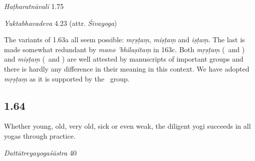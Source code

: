 \begin{ekdosis}
\begin{testimonia}[hp01_063]
\emph{Haṭharatnāvalī} 1.75

\begin{versinnote}
\end{versinnote}

\emph{Yuktabhavadeva} 4.23 (attr. \emph{Śivayoga})

\begin{versinnote}
\end{versinnote}

\end{testimonia}

\begin{philcomm}[hp01_063]
The variants of 1.63a all seem possible: \emph{mṛṣṭaṃ}, \emph{miṣṭaṃ} and \emph{iṣṭaṃ}. The last is made somewhat redundant by \emph{mano 'bhilaṣitaṃ} in 163c. Both \emph{mṛṣṭaṃ} (\textalpha\ and \texteta) and \emph{miṣṭaṃ} (\textbeta\ and \textgamma) are well attested by manuscripts of important groups and there is hardly any difference in their meaning in this context. We have adopted \emph{mṛṣṭaṃ} as it is supported by the \textalpha\ group.
\end{philcomm}

\subsection*{1.64}
\begin{translation}[hp01_064]
Whether young, old, very old, sick or even weak, the diligent yogi succeeds in all yogas through practice.
\end{translation}

\begin{sources}[hp01_064]
\emph{Dattātreyayogaśāstra} 40

\begin{versinnote}
\end{versinnote}


\end{sources}
\end{ekdosis}
